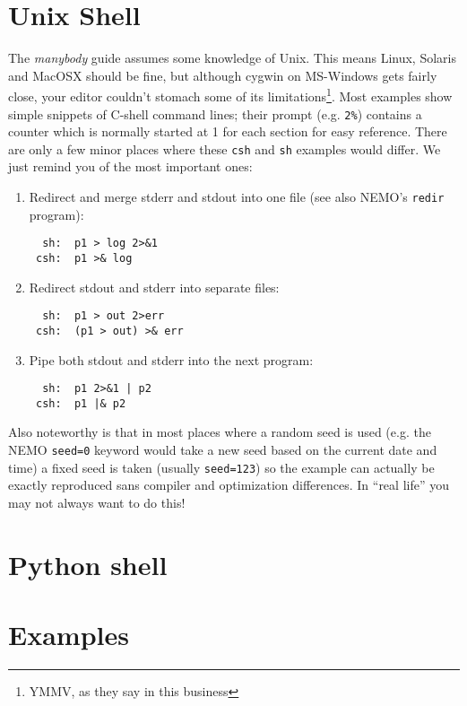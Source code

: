 {{\section*{Unix Shell}

The {\it manybody} guide assumes some knowledge
of Unix. This means Linux, Solaris and MacOSX should be fine, 
but although cygwin on MS-Windows
gets fairly close, your editor couldn't stomach some of 
its limitations\footnote{YMMV, as they say in this business}.
Most examples show simple snippets
of C-shell command lines; their prompt (e.g. \verb+2%+) 
contains a counter which is normally started at 1 for each section
for easy reference.
There are only a few minor places where these {\tt csh} and 
{\tt sh} examples would differ. We just remind you of
the most important ones:

\begin{enumerate}
\item 
Redirect and merge stderr and stdout into one file 
(see also NEMO's {\tt redir} program):
\footnotesize\begin{verbatim}
  sh:  p1 > log 2>&1
 csh:  p1 >& log
\end{verbatim}\normalsize
\item
Redirect stdout and stderr into separate files:
\footnotesize\begin{verbatim}
  sh:  p1 > out 2>err
 csh:  (p1 > out) >& err
\end{verbatim}\normalsize
\item
Pipe both stdout and stderr into the next program:
\footnotesize\begin{verbatim}
  sh:  p1 2>&1 | p2
 csh:  p1 |& p2
\end{verbatim}\normalsize
\end{enumerate}

Also noteworthy is that 
in most places where a random seed is used (e.g. the NEMO {\tt seed=0} keyword
would take a new seed based on the current date and time) 
a fixed seed is taken (usually {\tt seed=123}) 
so the example can actually be exactly reproduced sans compiler and optimization
differences. In ``real life'' you may not always want to do this!


\section*{Python shell}

\section*{Examples}

}}
